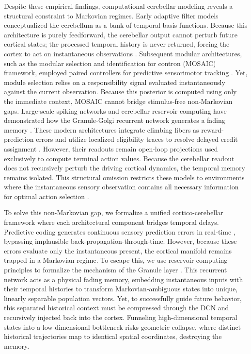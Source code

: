 \documentclass[12pt, a4paper]{extarticle}
\begin{document}
	Despite these empirical findings, computational cerebellar modeling reveals a structural constraint to Markovian regimes. Early adaptive filter models conceptualized the cerebellum as a bank of temporal basis functions. Because this architecture is purely feedforward, the cerebellar output cannot perturb future cortical states; the processed temporal history is never returned, forcing the cortex to act on instantaneous observations \parencite{fujitaAdaptiveFilterModel1982}. Subsequent modular architectures, such as the modular selection and identification for contron (MOSAIC) framework, employed paired controllers for predictive sensorimotor tracking \parencite{harunoMosaicModelSensorimotor2001, mehtaForwardModelsVisuomotor2002}. Yet, module selection relies on a responsibility signal evaluated instantaneously against the current observation. Because this posterior is computed using only the immediate context, MOSAIC cannot bridge stimulus-free non-Markovian gaps. Large-scale spiking networks and cerebellar reservoir computing have demonstrated how the Granule-Golgi recurrent network generates a fading memory \parencite{hoangPredictiveRewardpredictionErrors2025, yamazakiCerebellumLiquidState2007}. These modern architectures integrate climbing fibers as reward-prediction errors \parencite{jinRewarddrivenCerebellarClimbing2024} and utilize localized eligibility traces to resolve delayed credit assignment \parencite{verduzco-floresHowCreditAssignment2015, doyaWhatAreComputations1999}. However, their readouts remain open-loop projections used exclusively to compute terminal action values. Because the cerebellar readout does not recursively perturb the driving cortical dynamics, the temporal memory remains isolated. This structural omission restricts these models to environments where the instantaneous sensory observation contains all necessary information for optimal action selection \parencite{kakeiConsensusPaperModels2026, miallStateEstimationCerebellum2008}.
	
	To solve this non-Markovian gap, we formalize a unified cortico-cerebellar framework where each architectural component bridges temporal delays. Predictive coding generates continuous sensory prediction errors in real-time \parencite{fristonPredictiveCodingFreeenergy2009}, bypassing implausible back-propagation-through-time. However, because these errors evaluate only the instantaneous present, the cortical manifold remains trapped in a Markovian regime. To escape this, we use reservoir computing principles to formalize the mechanism of the Granule layer \parencite{maassLiquidStateMachine2002, hauserTheoreticalFoundationMorphological2011}. This recurrent network acts as a physical fading memory, embedding instantaneous inputs with their temporal histories to transform Markovian-ambiguous states into unique, linearly separable population vectors. Yet, to successfully guide future behavior, this separated historical context must be compressed through the DCN and recursively injected back into the cortex. Funneling high-dimensional temporal states into a low-dimensional bottleneck risks geometric collapse, where distinct historical trajectories map to identical spatial coordinates, destroying the memory.
	
\end{document}
